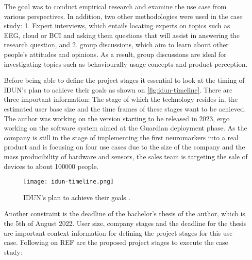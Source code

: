 The goal was to conduct empirical research and examine the use case from various perspectives. In addition, two other methodologies were used in the case study: 1. Expert interviews, which entails locating experts on topics such as EEG, cloud or BCI and asking them questions that will assist in answering the research question, and 2. group discussions, which aim to learn about other people's attitudes and opinions. As a result, group discussions are ideal for investigating topics such as behaviourally usage concepts and product perception.

Before being able to define the project stages it essential to look at the timing of IDUN's plan to achieve their goals as shown on \autoref{fig:idun-timeline}. There are three important information: The stage of which the technology resides in, the estimated user base size and the time frames of these stages want to be achieved. The author was working on the version starting to be released in 2023, ergo working on the software system aimed at the Guardian deployment phase. As the company is still in the stage of implementing the first neuromarkers into a real product and is focusing on four use cases due to the size of the company and the mass producibility of hardware and sensors, the sales team is targeting the sale of devices to about 100000 people.

\begin{figure}[!ht]
  \centering
  \texttt{[image: idun-timeline.png]}
  \caption{IDUN's plan to achieve their goals \citep{idun_guardian_nodate}.}
  \label{fig:idun-timeline}
\end{figure}

Another constraint is the deadline of the bachelor's thesis of the author, which is the 5th of August 2022. User size, company stages and the deadline for the thesis are important context information for defining the project stages for this use case. Following on REF are the proposed project stages to execute the case study:



